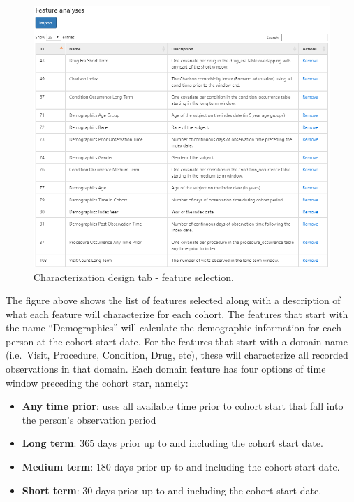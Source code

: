 \documentclass[11pt]{book}
\providecommand{\tightlist}{%
  \setlength{\itemsep}{0pt}\setlength{\parskip}{0pt}}
\theoremstyle{definition}
\theoremstyle{definition}
\theoremstyle{definition}
\theoremstyle{remark}
\begin{document}
\begin{figure}

{\centering \includegraphics[width=1\linewidth]{images/Characterization/atlasCharacterizationFeatureSelection} 

}

\caption{Characterization design tab - feature selection.}\label{fig:atlasCharacterizationFeatureSelection}
\end{figure}

The figure above shows the list of features selected along with a description of what each feature will characterize for each cohort. The features that start with the name ``Demographics'' will calculate the demographic information for each person at the cohort start date. For the features that start with a domain name (i.e.~Visit, Procedure, Condition, Drug, etc), these will characterize all recorded observations in that domain. Each domain feature has four options of time window preceding the cohort star, namely:

\begin{itemize}
\tightlist
\item
  \textbf{Any time prior}: uses all available time prior to cohort start that fall into the person's observation period
\item
  \textbf{Long term}: 365 days prior up to and including the cohort start date.
\item
  \textbf{Medium term}: 180 days prior up to and including the cohort start date.
\item
  \textbf{Short term}: 30 days prior up to and including the cohort start date.
\end{itemize}
\end{document}
